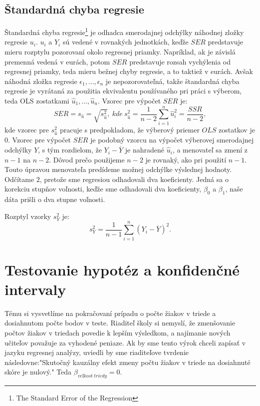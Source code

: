\documentclass[]{tukediphc}
\begin{document}
\subsection{Štandardná chyba regresie}

Štandardná chyba regresie\footnote{The Standard Error of the Regression} je odhadca smerodajnej odchýlky náhodnej zložky regresie $u_i$. $u_i$ a $Y_i$ sú vedené v rovnakých jednotkách, keďže $SER$ predstavuje mieru rozptylu pozorovaní okolo regresnej priamky. Napríklad, ak je závislá premenná vedená v eurách, potom $SER$ predstavuje rozsah vychýlenia od regresnej priamky, teda mieru bežnej chyby regresie, a to taktiež v eurách. Avšak náhodná zložka regresie $\epsilon_1, ..., \epsilon_n$ je nepozorovateľná, takže štandardná chyba regresie je vyrátaná za použitia ekvivalentu používaného pri práci s výberom, teda OLS zostatkami $\hat{u}_{1}, ..., \hat{u}_{n}$. Vzorec pre výpočet $SER$ je:
\begin{equation}
    SER = s_{\hat{u}} = \sqrt{s_{\hat{u}}^2}, \ kde \ s_{\hat{u}}^2 = \frac{1}{n-2}\sum_{i=1}^{n}\hat{u}_{i}^2 = \frac{SSR}{n-2},
\end{equation}
kde vzorec pre $s_{\hat{u}}^2$ pracuje s predpokladom, že výberový priemer $OLS$ zostatkov je $0$. Vzorec pre výpočet $SER$ je podobný vzorcu na výpočet výberovej smerodajnej odchýlky $Y$, s tým rozdielom, že $Y_i - \overline{Y}$ je nahradené $\hat{u}_{i}$, a menovateľ sa zmení z $n - 1$ na $n - 2$. Dôvod prečo použijeme $n - 2$ je rovnaký, ako pri použití $n - 1$. Touto úpravou menovateľa predídeme možnej odchýlke výslednej hodnoty. Odčítame $2$, pretože sme regresiou odhadovali dva koeficienty. Jedná sa o korekciu stupňov voľnosti, keďže sme odhadovali dva koeficienty, $\beta_0$  a $\beta_1$, naše dáta prišli o dva stupne voľnosti.  

Rozptyl vzorky $s^2_{Y}$ je:
\begin{equation}
    s^2_{Y} = \frac{1}{n - 1}\sum_{i=1}^{n}(Y_i - \overline{Y})^2.
\end{equation}

\section{Testovanie hypotéz a konfidenčné intervaly}

Tému si vysvetlíme na pokračovaní prípadu o počte žiakov v triede a dosiahnutom počte bodov v teste. Riaditeľ školy si nemyslí, že zmenšovanie počtov žiakov v triedach povedie k lepším výsledkom, a najímanie nových učiteľov považuje za vyhodené peniaze. Ak by sme tento výrok chceli zapísať v jazyku regresnej analýzy, uviedli by sme riaditeľove tvrdenie následovne:"Skutočný kauzálny efekt zmeny počtu žiakov v triede na dosiahnuté skóre je nulový." Teda $\beta_{veľkosť \ triedy} = 0$. 
\end{document}
